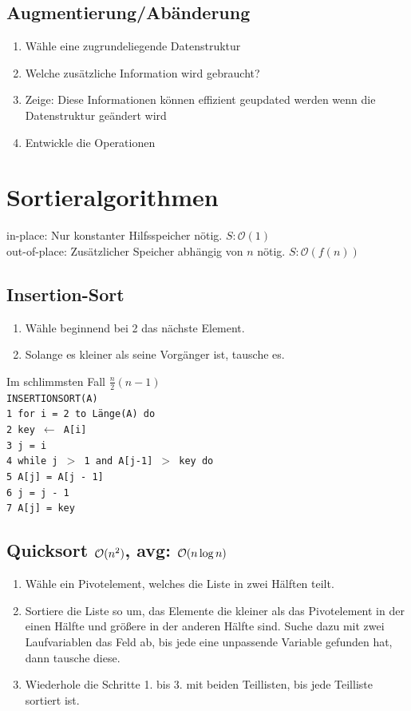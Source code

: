 \documentclass[fs, footer]{latex4ei}
\renewcommand{\t}{\texttt}
\begin{document}
\begin{multicols*}{4}
{{\subsection{Augmentierung/Abänderung}
\begin{enumerate}
	\item Wähle eine zugrundeliegende Datenstruktur
	\item Welche zusätzliche Information wird gebraucht?
	\item Zeige: Diese Informationen können effizient geupdated werden wenn die Datenstruktur geändert wird
	\item Entwickle die Operationen
\end{enumerate}

\section{Sortieralgorithmen}
in-place: Nur konstanter Hilfsspeicher nötig. $S:\mathcal O(1)$\\
out-of-place: Zusätzlicher Speicher abhängig von $n$ nötig. $S:\mathcal O(f(n))$\\


\subsection{Insertion-Sort}
\begin{enumerate}
	\item Wähle beginnend bei 2 das nächste Element. 
	\item Solange es kleiner als seine Vorgänger ist, tausche es.
\end{enumerate}
Im schlimmsten Fall $\frac{n}{2}(n-1)$\\
\t{INSERTIONSORT(A)\\
1\ for i = 2 to Länge(A) do\\
2\ \quad key $\leftarrow$ A[i]\\
3\ \quad j = i\\
4\ \quad while j $>$ 1 and A[j-1] $>$ key do\\
5\ \qquad 	A[j] = A[j - 1]\\
6\ \qquad 	j = j - 1\\
7\ \quad 	A[j] = key
}

\subsection{Quicksort $\operatorname{\mathcal O}(n^2)$, avg: $\operatorname{\mathcal O}(n\log n)$}
\begin{enumerate}
	\item Wähle ein Pivotelement, welches die Liste in zwei Hälften teilt. 
	\item Sortiere die Liste so um, das Elemente die kleiner als das Pivotelement in der einen Hälfte und größere in der anderen Hälfte sind. 
		Suche dazu mit zwei Laufvariablen das Feld ab, bis jede eine unpassende Variable gefunden hat, dann tausche diese.
	\item Wiederhole die Schritte 1. bis 3. mit beiden Teillisten, bis jede Teilliste sortiert ist.
\end{enumerate}

}}
\end{multicols*}
\end{document}
